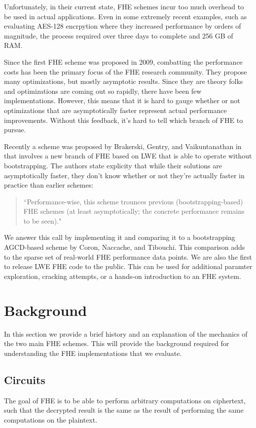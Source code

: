 \documentclass[letterpaper,twocolumn,10pt]{article}
\begin{document}
Unfortunately, in their current state, FHE schemes incur too much overhead to be used in actual applications. Even in some extremely recent examples, such as evaluating AES-128 encrpytion where they increased performance by orders of magnitude, the process required over three days to complete and 256 GB of RAM\cite{AES}. 

Since the first FHE scheme was proposed in 2009, combatting the performance costs has been the primary focus of the FHE research community. They propose many optimizations, but mostly asymptotic results. Since they are theory folks and optimizations are coming out so rapidly, there have been few implementations. However, this means that it is hard to gauge whether or not optimizations that are asymptotically faster represent actual performance improvements. Without this feedback, it's hard to tell which branch of FHE to pursue.

Recently a scheme was proposed by Brakerski, Gentry, and Vaikuntanathan in \cite{SansBootstrapping} that involves a new branch of FHE based on LWE that is able to operate without bootstrapping. The authors state explicity that while their solutions are asymptotically faster, they don't know whether or not they're actually faster in practice than earlier schemes:

\begin{quotation}
``Performance-wise, this scheme trounces previous (bootstrapping-based) FHE schemes (at least asymptotically; the concrete performance remains to be seen)."
\end{quotation}

We answer this call by implementing it and comparing it to a bootstrapping AGCD-based scheme by Coron, Naccache, and Tibouchi. This comparison adds to the sparse set of real-world FHE performance data points. We are also the first to release LWE FHE code to the public. This can be used for additional paramter exploration, cracking attempts, or a hands-on introduction to an FHE system.


\section{Background}
In this section we provide a brief history and an explanation of the mechanics of the two main FHE schemes. This will provide the background required for understanding the FHE implementations that we evaluate.

\subsection{Circuits}
The goal of FHE is to be able to perform arbitrary computations on ciphertext, such that the decrypted result is the same as the result of performing the same computations on the plaintext.
\end{document}
